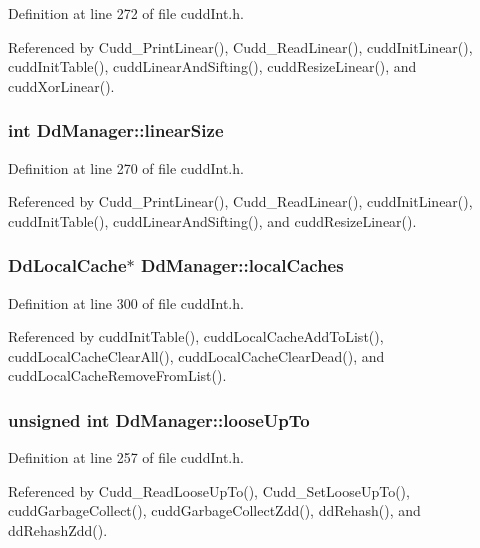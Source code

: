 Definition at line 272 of file cudd\-Int.h.

Referenced by Cudd\_\-Print\-Linear(), Cudd\_\-Read\-Linear(), cudd\-Init\-Linear(), cudd\-Init\-Table(), cudd\-Linear\-And\-Sifting(), cudd\-Resize\-Linear(), and cudd\-Xor\-Linear().
\subsubsection{\setlength{\rightskip}{0pt plus 5cm}int \bf{Dd\-Manager::linear\-Size}}\label{structDdManager_e9cdc0a7b5b50b73f68549df7be6eb05}




Definition at line 270 of file cudd\-Int.h.

Referenced by Cudd\_\-Print\-Linear(), Cudd\_\-Read\-Linear(), cudd\-Init\-Linear(), cudd\-Init\-Table(), cudd\-Linear\-And\-Sifting(), and cudd\-Resize\-Linear().
\subsubsection{\setlength{\rightskip}{0pt plus 5cm}\bf{Dd\-Local\-Cache}$\ast$ \bf{Dd\-Manager::local\-Caches}}\label{structDdManager_8f62071184b231f7320214e735b7fd0d}




Definition at line 300 of file cudd\-Int.h.

Referenced by cudd\-Init\-Table(), cudd\-Local\-Cache\-Add\-To\-List(), cudd\-Local\-Cache\-Clear\-All(), cudd\-Local\-Cache\-Clear\-Dead(), and cudd\-Local\-Cache\-Remove\-From\-List().
\subsubsection{\setlength{\rightskip}{0pt plus 5cm}unsigned int \bf{Dd\-Manager::loose\-Up\-To}}\label{structDdManager_08442885cc19bd4e63ee8ca294669efa}




Definition at line 257 of file cudd\-Int.h.

Referenced by Cudd\_\-Read\-Loose\-Up\-To(), Cudd\_\-Set\-Loose\-Up\-To(), cudd\-Garbage\-Collect(), cudd\-Garbage\-Collect\-Zdd(), dd\-Rehash(), and dd\-Rehash\-Zdd().
